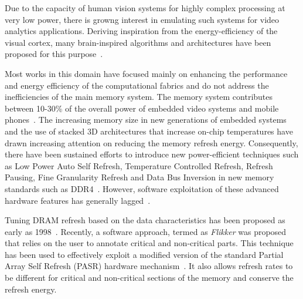 Due to the capacity of human vision systems for highly complex processing at very low power, there is growng interest in emulating such systems for video analytics applications.
Deriving inspiration from the energy-efficiency of the visual cortex, many brain-inspired algorithms and architectures have been proposed for this purpose~\cite{Nere2011,Chen2014,Kestur2012}. %



Most works in this domain have focused mainly on enhancing the performance and energy efficiency of the computational fabrics and do not address the inefficiencies of the main memory system. The memory system contributes between 10-30\% of the overall power of embedded video systems and mobile phones~\cite{CarrollAaronHeiser2010}. 
The increasing memory size in new generations of embedded systems and the use of stacked 3D architectures that increase on-chip temperatures have drawn increasing attention on reducing the memory refresh energy. Consequently, there have been sustained efforts to introduce new power-efficient techniques such as Low Power Auto Self Refresh, Temperature Controlled Refresh, Refresh Pausing, Fine Granularity Refresh and Data Bus Inversion in new memory standards such as DDR4~\cite{jedec-sdram-standards}.  However, software exploitation of these advanced hardware features has generally lagged~\cite{Mukundan2013,refresh-pausing-taco2014}. 

Tuning DRAM refresh based on the data characteristics has been proposed as early as 1998~\cite{islped98}. Recently, a software approach, termed as \emph{Flikker} was proposed that relies on the user to annotate critical and non-critical parts. This technique has been used to effectively exploit a modified version of the standard Partial Array Self Refresh (PASR) hardware mechanism~\cite{Liu2011}. It also allows refresh rates to be different for critical and non-critical sections of the memory and conserve the refresh energy. 

